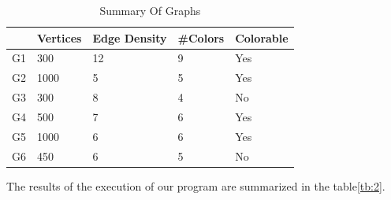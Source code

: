 \documentclass[10pt,twoside]{article}
\begin{document}
\begin{table}[h]
\centering
\begin{tabular}{|l|l|l|l|l|}
\hline
   & Vertices & Edge Density & \#Colors &  Colorable   \\ \hline
G1 & 300      & 12           & 9        & Yes \\ \hline
G2 & 1000     & 5            & 5        & Yes \\ \hline
G3 & 300      & 8            & 4        & No  \\ \hline
G4 & 500      & 7            & 6        & Yes \\ \hline
G5 & 1000     & 6            & 6        & Yes \\ \hline
G6 & 450      & 6            & 5        & No \\ \hline
\end{tabular}
\caption{Summary Of Graphs}
\label{tb:1}
\end{table}

The results of the execution of our program are summarized in the table\ref{tb:2}.
\end{document}

